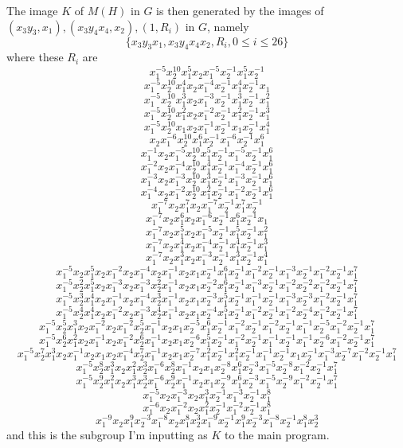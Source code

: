 \documentclass[a4paper,12pt]{article}
\numberwithin{equation}{section}
\numberwithin{figure}{section}
\begin{document}
The image $K$ of $M(H)$ in $G$ is then generated by 
the images of $ (x_3y_3,x_1), (x_3y_4x_4,x_2), (1,R_i)$ in $G$, namely 
\[\{x_3y_3x_1, x_3y_4x_4x_2, R_i, 0\le i \le 26\}\]
where these $R_i$ are 
\[x_1^{-5}x_2^{10}x_1^{5}x_2x_1^{-5}x_2^{-1}x_1^{5}x_2^{-1}\]
\[x_1^{-5}x_2^{10}x_1^{4}x_2x_1^{-4}x_2^{-1}x_1^{4}x_2^{-1}x_1\]
\[x_1^{-5}x_2^{10}x_1^{3}x_2x_1^{-3}x_2^{-1}x_1^{3}x_2^{-1}x_1^{2}\]
\[x_1^{-5}x_2^{10}x_1^{2}x_2x_1^{-2}x_2^{-1}x_1^{2}x_2^{-1}x_1^{3}\]
\[x_1^{-5}x_2^{10}x_1x_2x_1^{-1}x_2^{-1}x_1x_2^{-1}x_1^{4}\]
\[x_2x_1^{-6}x_2^{10}x_1^{6}x_2^{-1}x_1^{-6}x_2^{-1}x_1^{6}\]
\[x_1^{-1}x_2x_1^{-5}x_2^{10}x_1^{5}x_2^{-1}x_1^{-5}x_2^{-1}x_1^{6}\]
\[x_1^{-2}x_2x_1^{-4}x_2^{10}x_1^{4}x_2^{-1}x_1^{-4}x_2^{-1}x_1^{6}\]
\[x_1^{-3}x_2x_1^{-3}x_2^{10}x_1^{3}x_2^{-1}x_1^{-3}x_2^{-1}x_1^{6}\]
\[x_1^{-4}x_2x_1^{-2}x_2^{10}x_1^{2}x_2^{-1}x_1^{-2}x_2^{-1}x_1^{6}\]
\[x_1^{-7}x_2x_1^{7}x_2x_1^{-7}x_2^{-1}x_1^{7}x_2^{-1}\]
\[x_1^{-7}x_2x_1^{6}x_2x_1^{-6}x_2^{-1}x_1^{6}x_2^{-1}x_1\]
\[x_1^{-7}x_2x_1^{5}x_2x_1^{-5}x_2^{-1}x_1^{5}x_2^{-1}x_1^{2}\]
\[x_1^{-7}x_2x_1^{4}x_2x_1^{-4}x_2^{-1}x_1^{4}x_2^{-1}x_1^{3}\]
\[x_1^{-7}x_2x_1^{3}x_2x_1^{-3}x_2^{-1}x_1^{3}x_2^{-1}x_1^{4}\]
\[x_1^{-5}x_2x_1^{5}x_2x_1^{-2}x_2x_1^{-4}x_2x_1^{-1}x_2x_1x_2^{-1}x_1^{6}x_2^{-1}x_1^{-2}x_2^{-1}x_1^{-3}x_2^{-1}x_1^{-2}x_2^{-1}x_1^{7}\]
\[x_1^{-5}x_2^{2}x_1^{5}x_2x_1^{-3}x_2x_1^{-3}x_2^{2}x_1^{-1}x_2x_1x_2^{-2}x_1^{6}x_2^{-1}x_1^{-3}x_2^{-1}x_1^{-2}x_2^{-2}x_1^{-2}x_2^{-1}x_1^{7}\]
\[x_1^{-5}x_2^{3}x_1^{4}x_2x_1^{-1}x_2x_1^{-4}x_2^{3}x_1^{-1}x_2x_1x_2^{-3}x_1^{5}x_2^{-1}x_1^{-1}x_2^{-1}x_1^{-3}x_2^{-3}x_1^{-2}x_2^{-1}x_1^{7}\]
\[x_1^{-5}x_2^{4}x_1^{4}x_2x_1^{-2}x_2x_1^{-3}x_2^{4}x_1^{-1}x_2x_1x_2^{-4}x_1^{5}x_2^{-1}x_1^{-2}x_2^{-1}x_1^{-2}x_2^{-4}x_1^{-2}x_2^{-1}x_1^{7}\]
\[x_1^{-5}x_2^{5}x_1^{3}x_2x_1^{-2}x_2x_1^{-2}x_2^{5}x_1^{-1}x_2x_1x_2^{-5}x_1^{6}x_2^{-1}x_1^{-2}x_2^{-1}x_1^{-2}x_2^{-1}x_1^{-1}x_2^{-5}x_1^{-2}x_2^{-1}x_1^{7}\]
\[x_1^{-5}x_2^{6}x_1^{2}x_2x_1^{-1}x_2x_1^{-2}x_2^{6}x_1^{-1}x_2x_1x_2^{-6}x_1^{5}x_2^{-1}x_1^{-2}x_2^{-1}x_1^{-1}x_2^{-1}x_1^{-1}x_2^{-6}x_1^{-2}x_2^{-1}x_1^{7}\]
\[x_1^{-5}x_2^{7}x_1^{3}x_2x_1^{-1}x_2x_1x_2x_1^{-4}x_2^{7}x_1^{-1}x_2x_1x_2^{-7}x_1^{2}x_2^{-1}x_1^{2}x_2^{-1}x_1^{-1}x_2^{-1}x_1x_2^{-1}x_1^{-3}x_2^{-7}x_1^{-2}x_2^{-1}x_1^{7}\]
\[x_1^{-5}x_2^{8}x_1^{3}x_2x_1^{2}x_2^{3}x_1^{-6}x_2^{8}x_1^{-1}x_2x_1x_2^{-8}x_1^{6}x_2^{-3}x_1^{-5}x_2^{-8}x_1^{-2}x_2^{-1}x_1^{7}\]
\[x_1^{-5}x_2^{9}x_1^{2}x_2x_1^{3}x_2^{3}x_1^{-6}x_2^{9}x_1^{-1}x_2x_1x_2^{-9}x_1^{6}x_2^{-3}x_1^{-5}x_2^{-9}x_1^{-2}x_2^{-1}x_1^{7}\]
\[x_1^{-5}x_2x_1^{-3}x_2x_1^{3}x_2^{-1}x_1^{-3}x_2^{-1}x_1^{8}\]
\[x_1^{-6}x_2x_1^{-2}x_2x_1^{2}x_2^{-1}x_1^{-2}x_2^{-1}x_1^{8}\]
\[x_1^{-9}x_2x_1^{9}x_2^{-3}x_1^{-8}x_2x_1^{8}x_2^{3}x_1^{-9}x_2^{-1}x_1^{9}x_2^{-3}x_1^{-8}x_2^{-1}x_1^{8}x_2^{3}\]
and this is the subgroup I'm inputting as $K$ to the main program.
\end{document}
